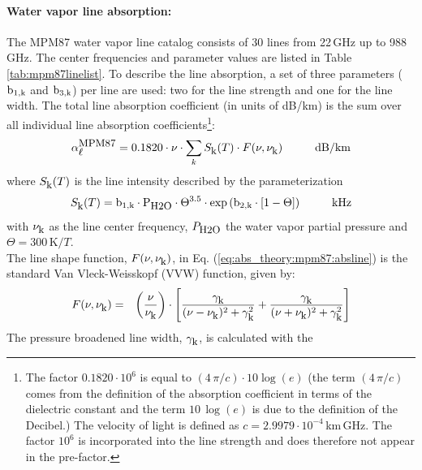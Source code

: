 \paragraph{Water vapor line absorption:}
\label{levele:mpm87_h2olines}
The MPM87 \citep{liebeandlayton:87} water vapor line catalog consists 
of 30 lines from 22\,GHz up to 988\,GHz. The center frequencies and parameter 
values are listed in Table \ref{tab:mpm87linelist}. To describe the line 
absorption, a set of three parameters ($\rm b_{\rm 1,k}$ and $\rm b_{\rm 3,k}$) per line are used: two 
for the line strength and one for the line width. The total line 
absorption coefficient (in units of dB/km) is the sum over all 
individual line absorption coefficients\footnote{The factor 
  $0.1820 \cdot 10^{6}$ is equal to $(4\,\pi/c)\cdot 10\log{(e)}$
  (the term $(4\,\pi/c)$ comes from the definition of the absorption
  coefficient in terms of the dielectric constant and the term 
  $10\,\log{(e)}$ is due to the definition of the Decibel.) The
  velocity of light is defined as $c=2.9979\cdot 10^{-4}$\,km\,GHz. 
  The factor $10^{6}$ is incorporated into the line strength and 
  does therefore not appear in the pre-factor.}:
\begin{equation}
  \label{eq:abs_theory:mpm87:absline}
  \alphampmol = 0.1820 \cdot \nu \cdot
  \sum_{k}{\inten \cdot \shape}\hspace*{10mm}\mbox{dB/km}
\end{equation}
where $S_{\mbox{\rm \small k}}(T)$ is the line intensity described by the parameterization
\begin{equation}
  \label{eq:abs_theory:mpm87:strength}
  \inten = \bek \cdot \phzo \cdot \Theta^{3.5} 
           \cdot \exp{(\bzk \cdot [1-\Theta])}\hspace*{10mm}\mbox{kHz}
\end{equation}
with $\nu_{\mbox{\rm \small k}}$ as the line center frequency, $P_{\mbox{\rm \small H2O}}$ the water
vapor partial pressure and $\Theta = 300\,\mbox{K}/T$.\\
The line shape function, $F(\nu,\nu_{\mbox{\rm \small k}})$, in Eq. (\ref{eq:abs_theory:mpm87:absline}) 
is the standard Van Vleck-Weisskopf (VVW) function, given by:
\begin{eqnarray}
  \label{eq:abs_theory:mpm87:VVW}
  F(\nu,\nu_{\mbox{\rm \small k}}) & = & \left(\frac{\nu}{\nu_{\mbox{\rm \small k}}}\right) \cdot 
               \left[\frac{\gamma_{\mbox{\rm \small k}}}{(\nu - \nu_{\mbox{\rm \small k}})^2 + \gamma_{\mbox{\rm \small k}}^2} + 
                     \frac{\gamma_{\mbox{\rm \small k}}}{(\nu + \nu_{\mbox{\rm \small k}})^2 + \gamma_{\mbox{\rm \small k}}^2}\right]\\
\end{eqnarray}
The pressure broadened line width, $\gamma_{\mbox{\rm \small k}}$, is calculated with the 
